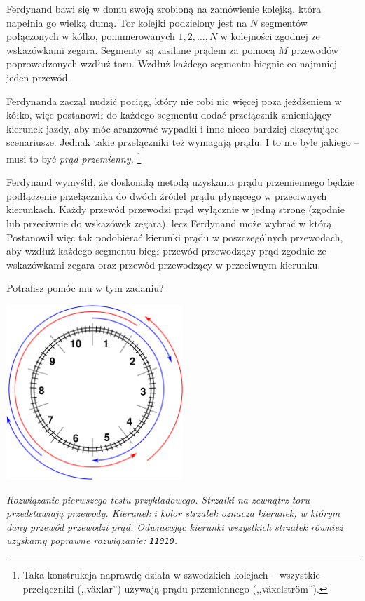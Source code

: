 \ifx\boi\undefined\fi
\def\version{jury-1}
Ferdynand bawi się w domu swoją zrobioną na zamówienie kolejką, która napełnia go wielką dumą.
Tor kolejki podzielony jest na $N$ segmentów połączonych w kółko, ponumerowanych $1, 2, \dots, N$
w kolejności zgodnej ze wskazówkami zegara. Segmenty są zasilane prądem za pomocą $M$ przewodów poprowadzonych
wzdłuż toru. Wzdłuż każdego segmentu biegnie co najmniej jeden przewód.

Ferdynanda zaczął nudzić pociąg, który nie robi nic więcej poza jeżdżeniem w kółko, więc
postanowił do każdego segmentu dodać przełącznik zmieniający kierunek jazdy, aby móc
aranżować wypadki i inne nieco bardziej ekscytujące scenariusze.
Jednak takie przełączniki też wymagają prądu. I to nie byle jakiego -- musi to być \emph{prąd przemienny.}
\footnote{Taka konstrukcja naprawdę działa w szwedzkich kolejach -- wszystkie przełączniki (,,växlar'') używają prądu przemiennego (,,växelström'').}


Ferdynand wymyślił, że doskonałą metodą uzyskania prądu przemiennego
będzie podłączenie przełącznika do dwóch źródeł prądu płynącego w przeciwnych kierunkach.
Każdy przewód przewodzi prąd wyłącznie w jedną stronę (zgodnie lub przeciwnie do wskazówek zegara),
lecz Ferdynand może wybrać w którą. Postanowił więc tak podobierać kierunki prądu w poszczególnych przewodach,
aby wzdłuż każdego segmentu biegł przewód przewodzący prąd zgodnie ze wskazówkami zegara oraz przewód przewodzący
w przeciwnym kierunku.

Potrafisz pomóc mu w tym zadaniu?

\vspace{2mm}
\begin{center}
\includegraphics[width=0.5\textwidth]{alternatingfig.pdf}
\end{center}
\vspace{1mm}
{\em Rozwiązanie pierwszego testu przykładowego. Strzałki na zewnątrz toru przedstawiają przewody.
Kierunek i kolor strzałek oznacza kierunek, w którym dany przewód przewodzi prąd.
Odwracając kierunki wszystkich strzałek również uzyskamy poprawne rozwiązanie: \texttt{11010}.}

